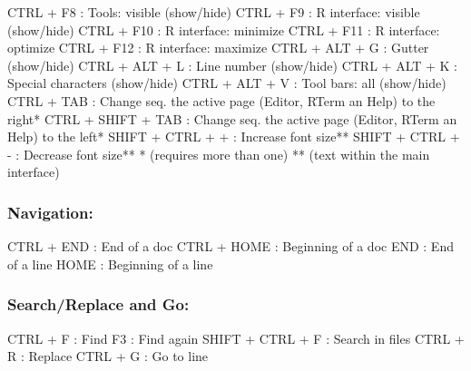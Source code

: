 \vspace{-0.5cm}
\begin{Rtables}[caption={[Visualization keyboard shortcuts]
    Visualization keyboard shortcuts},
  label=hotkey:visualization]
  CTRL  + F8              : Tools: visible (show/hide)
  CTRL  + F9              : R interface: visible (show/hide)
  CTRL  + F10             : R interface: minimize
  CTRL  + F11             : R interface: optimize
  CTRL  + F12             : R interface: maximize
  CTRL  + ALT  + G        : Gutter (show/hide)
  CTRL  + ALT  + L        : Line number (show/hide)
  CTRL  + ALT  + K        : Special characters (show/hide)
  CTRL  + ALT  + V        : Tool bars: all (show/hide)
  CTRL  + TAB             : Change seq. the active page
                            (Editor, RTerm an Help) to the right*
  CTRL  + SHIFT + TAB     : Change seq. the active page
                            (Editor, RTerm an Help) to the left*
  SHIFT + CTRL + +        : Increase font size**
  SHIFT + CTRL + -        : Decrease font size**
  *  (requires more than one)
  ** (text within the main interface)
\end{Rtables}


\newpage
\subsubsection{Navigation:}

\vspace{-0.5cm}
\begin{Rtables}[caption={[Navigation keyboard shortcuts]
    Navigation keyboard shortcuts},
  label=hotkey:navigation]
  CTRL  + END             : End of a doc
  CTRL  + HOME            : Beginning of a doc
  END                     : End of a line
  HOME                    : Beginning of a line
\end{Rtables}

\subsubsection{Search/Replace and Go:}

\vspace{-0.5cm}
\begin{Rtables}[caption={[Search/Replace and go keyboard shortcuts]
    Search/Replace and go keyboard shortcuts},
  label=hotkey:search]
  CTRL  + F               : Find
  F3                      : Find again
  SHIFT + CTRL + F        : Search in files
  CTRL  + R               : Replace
  CTRL  + G               : Go to line
\end{Rtables}


